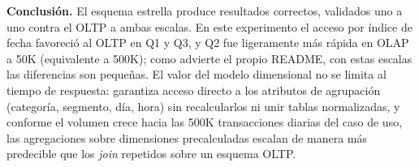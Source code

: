 \documentclass[10pt]{article}
\begin{document}
\textbf{Conclusión.} El esquema estrella produce resultados correctos, validados uno a uno contra el OLTP a ambas escalas. En este experimento el acceso por índice de fecha favoreció al OLTP en Q1 y Q3, y Q2 fue ligeramente más rápida en OLAP a 50K (equivalente a 500K); como advierte el propio README, con estas escalas las diferencias son pequeñas. El valor del modelo dimensional no se limita al tiempo de respuesta: garantiza acceso directo a los atributos de agrupación (categoría, segmento, día, hora) sin recalcularlos ni unir tablas normalizadas, y conforme el volumen crece hacia las 500K transacciones diarias del caso de uso, las agregaciones sobre dimensiones precalculadas escalan de manera más predecible que los \emph{join} repetidos sobre un esquema OLTP.
\end{document}
